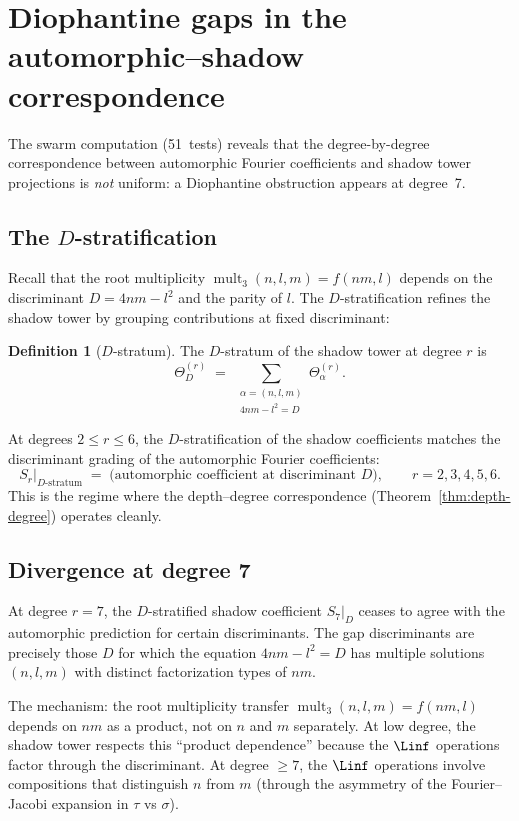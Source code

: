\documentclass[11pt]{amsart}
\theoremstyle{definition}
\newtheorem{definition}[theorem]{Definition}
\theoremstyle{remark}
\DeclareMathOperator{\mult}{mult}
\begin{document}
\section{Diophantine gaps in the automorphic--shadow correspondence}
\label{sec:diophantine-gaps}

The swarm computation (51~tests) reveals that the
degree-by-degree correspondence between automorphic Fourier
coefficients and shadow tower projections is \emph{not}
uniform: a Diophantine obstruction appears at degree~7.

\subsection{The $D$-stratification}

Recall that the root multiplicity $\mult_3(n,l,m) = f(nm,l)$
depends on the discriminant $D = 4nm - l^2$ and the parity of
$l$. The $D$-stratification refines the shadow tower by
grouping contributions at fixed discriminant:

\begin{definition}[$D$-stratum]
The $D$-stratum of the shadow tower at degree $r$ is
\[
 \Theta^{(r)}_D \;=\;
 \sum_{\substack{\alpha = (n,l,m) \\ 4nm - l^2 = D}}
 \Theta^{(r)}_\alpha.
\]
\end{definition}

\noindent
At degrees $2 \leq r \leq 6$, the $D$-stratification of
the shadow coefficients matches the discriminant grading
of the automorphic Fourier coefficients:
\[
 S_r \big|_{D\text{-stratum}}
 \;=\; \text{(automorphic coefficient at discriminant } D \text{)},
 \qquad r = 2, 3, 4, 5, 6.
\]
This is the regime where the depth--degree correspondence
(Theorem~\ref{thm:depth-degree}) operates cleanly.

\subsection{Divergence at degree 7}

At degree $r = 7$, the $D$-stratified shadow coefficient
$S_7|_D$ ceases to agree with the automorphic prediction for
certain discriminants. The gap discriminants are precisely
those $D$ for which the equation $4nm - l^2 = D$ has
multiple solutions $(n,l,m)$ with distinct factorization
types of $nm$.

The mechanism: the root multiplicity transfer
$\mult_3(n,l,m) = f(nm, l)$ depends on $nm$ as a product,
not on $n$ and $m$ separately. At low degree, the shadow
tower respects this ``product dependence'' because the
$\Linf$ operations factor through the discriminant. At
degree $\geq 7$, the $\Linf$ operations involve compositions
that distinguish $n$ from $m$ (through the asymmetry of the
Fourier--Jacobi expansion in $\tau$ vs $\sigma$).
\end{document}
